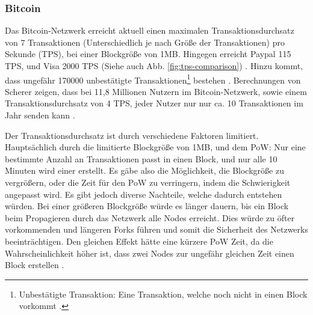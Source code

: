 \subsubsection{Bitcoin}
Das Bitcoin-Netzwerk erreicht aktuell einen maximalen Transaktionsdurchsatz von 7 Transaktionen (Unterschiedlich je nach Größe der Transaktionen) pro Sekunde (TPS), bei einer Blockgröße von 1MB.  Hingegen erreicht Paypal 115 TPS, und Visa 2000 TPS (Siehe auch Abb. \ref{fig:tps-comparison}) \cite{BitcoinTeamScalabilityBitcoinWiki}. Hinzu kommt, dass ungefähr 170000 unbestätigte Transaktionen\footnote{Unbestätigte Transaktion: Eine Transaktion, welche noch nicht in einen Block vorkommt \cite{AntonopoulosMasteringbitcoin2015}.} bestehen \cite{BlockchainUnternehmenUnbestatigteTransaktionenBitcoin}. Berechnungen von Scherer zeigen, dass bei 11,8 Millionen Nutzern im Bitcoin-Netzwerk, sowie einem Transaktionsdurchsatz von 4 TPS, jeder Nutzer nur nur ca. 10 Transaktionen im Jahr senden kann \cite{SchererPerformanceScalabilityBlockchain2017}.

Der Transaktionsdurchsatz ist durch verschiedene Faktoren limitiert. Hauptsächlich durch die limitierte Blockgröße von 1MB, und dem PoW: Nur eine bestimmte Anzahl an Transaktionen passt in einen Block, und nur alle 10 Minuten wird einer erstellt. Es gäbe also die Möglichkeit, die Blockgröße zu vergrößern, oder die Zeit für den PoW zu verringern, indem die Schwierigkeit angepasst wird. Es gibt jedoch diverse Nachteile, welche dadurch entstehen würden. Bei einer größeren Blockgröße würde es länger dauern, bis ein Block beim Propagieren durch das Netzwerk alle Nodes erreicht. Dies würde zu öfter vorkommenden und längeren Forks führen und somit die Sicherheit des Netzwerks beeinträchtigen. Den gleichen Effekt hätte eine kürzere PoW Zeit, da die Wahrscheinlichkeit höher ist, dass zwei Nodes zur ungefähr gleichen Zeit einen Block erstellen \cite{SchererPerformanceScalabilityBlockchain2017} \cite{EthereumTeamEthereumWhitePaper2017} \cite{SompolinskyAcceleratingBitcoinTransaction2013}. 

